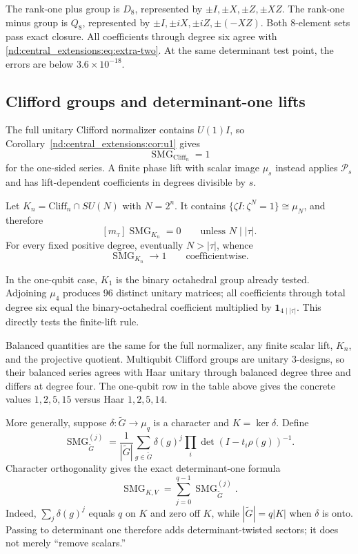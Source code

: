 \documentclass[10pt]{article}
\newcommand{\SMG}{\operatorname{SMG}}
\newcommand{\MGF}{\SMG}
\newcommand{\PP}{\mathcal P}
\begin{document}
The rank-one plus group is $D_8$, represented by $\pm I,\pm X,\pm Z,\pm XZ$.
The rank-one minus group is $Q_8$, represented by
$\pm I,\pm iX,\pm iZ,\pm(-XZ)$.  Both $8$-element sets pass exact closure.
All coefficients through degree six agree with \eqref{nd:central_extensions:eq:extra-two}.  At the
same determinant test point, the errors are below $3.6\times10^{-18}$.

\subsection{Clifford groups and determinant-one lifts}

The full unitary Clifford normalizer contains $U(1)I$, so
Corollary~\ref{nd:central_extensions:cor:u1} gives
\[
 \MGF_{\mathrm{Cliff}_n}=1
\]
for the one-sided series.  A finite phase lift with scalar image $\mu_s$
instead applies $\PP_s$ and has lift-dependent coefficients in degrees
divisible by $s$.

Let $K_n=\mathrm{Cliff}_n\cap SU(N)$ with $N=2^n$.  It contains
$\{\zeta I:\zeta^N=1\}\cong\mu_N$, and therefore
\begin{equation}\label{nd:central_extensions:eq:cliff-selection}
 [m_\tau]\MGF_{K_n}=0\qquad\text{unless }N\mid|\tau|.
\end{equation}
For every fixed positive degree, eventually $N>|\tau|$, whence
\begin{equation}\label{nd:central_extensions:eq:cliff-limit}
 \MGF_{K_n}\longrightarrow1\qquad\text{coefficientwise}.
\end{equation}

In the one-qubit case, $K_1$ is the binary octahedral group already tested.
Adjoining $\mu_4$ produces $96$ distinct unitary matrices; all coefficients
through total degree six equal the binary-octahedral coefficient multiplied
by $\mathbf1_{4\mid|\tau|}$.  This directly tests the finite-lift rule.

Balanced quantities are the same for the full normalizer, any finite scalar
lift, $K_n$, and the projective quotient.  Multiqubit Clifford groups are
unitary $3$-designs, so their balanced series agrees with Haar unitary
through balanced degree three and differs at degree four.  The one-qubit
row in the table above gives the concrete values $1,2,5,15$ versus Haar
$1,2,5,14$.

More generally, suppose $\delta:\widetilde G\to\mu_q$ is a character and
$K=\ker\delta$.  Define
\[
 \MGF_{\widetilde G}^{(j)}
 =\frac1{|\widetilde G|}\sum_{g\in\widetilde G}\delta(g)^j
 \prod_i\det(I-t_i\rho(g))^{-1}.
\]
Character orthogonality gives the exact determinant-one formula
\begin{equation}\label{nd:central_extensions:eq:kernel-fourier}
 \boxed{\MGF_{K,V}=\sum_{j=0}^{q-1}\MGF_{\widetilde G}^{(j)}.}
\end{equation}
Indeed, $\sum_j\delta(g)^j$ equals $q$ on $K$ and zero off $K$, while
$|\widetilde G|=q|K|$ when $\delta$ is onto.  Passing to determinant one
therefore adds determinant-twisted sectors; it does not merely ``remove
scalars.''
\end{document}
